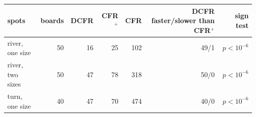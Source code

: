 \begin{tabular}{lrrrrrr}
\toprule
spots & boards & DCFR & CFR$^+$ & CFR & DCFR faster/slower than CFR$^+$ & sign test \\ \midrule
river, one size & 50 & 16 & 25 & 102 & 49/1 & $p<10^{-6}$ \\
river, two sizes & 50 & 47 & 78 & 318 & 50/0 & $p<10^{-6}$ \\
turn, one size & 40 & 47 & 70 & 474 & 40/0 & $p<10^{-6}$ \\
\bottomrule
\end{tabular}
